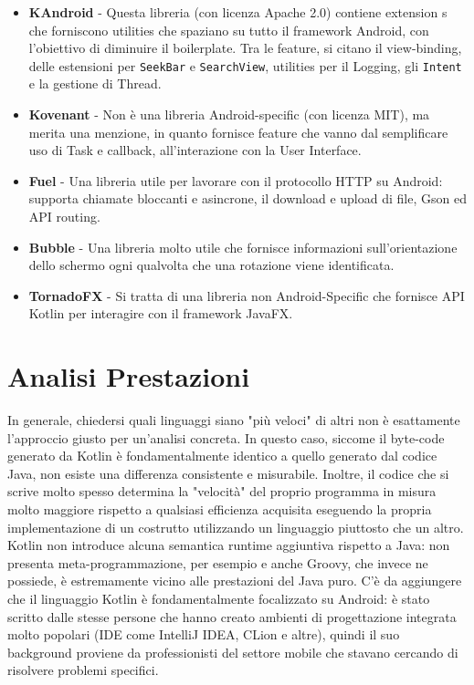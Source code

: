 \begin{itemize}
  \item {\bfseries KAndroid} - Questa libreria (con licenza Apache 2.0) contiene extension s che forniscono utilities che spaziano su tutto il framework Android, con l'obiettivo di diminuire il boilerplate. Tra le feature, si citano il view-binding, delle estensioni per \texttt{SeekBar} e \texttt{SearchView}, utilities per il Logging, gli \texttt{Intent} e la gestione di Thread.
  \item {\bfseries Kovenant} - Non è una libreria Android-specific (con licenza MIT), ma merita una menzione, in quanto fornisce feature che vanno dal semplificare uso di Task e callback, all'interazione con la User Interface.
  \item {\bfseries Fuel} - Una libreria utile per lavorare con il protocollo HTTP su Android: supporta chiamate bloccanti e asincrone, il download e upload di file, Gson ed API routing.
  \item {\bfseries Bubble} - Una libreria molto utile che fornisce informazioni sull'orientazione dello schermo ogni qualvolta che una rotazione viene identificata.
  \item {\bfseries TornadoFX} - Si tratta di una libreria non Android-Specific che fornisce API Kotlin per interagire con il framework JavaFX.\\
\end{itemize}

\section{Analisi Prestazioni}
In generale, chiedersi quali linguaggi siano "più veloci" di altri non è esattamente l'approccio giusto per un'analisi concreta. In questo caso, siccome il byte-code generato da Kotlin è fondamentalmente identico a quello generato dal codice Java, non esiste una differenza consistente e misurabile. Inoltre, il codice che si scrive molto spesso determina la "velocità" del proprio programma in misura molto maggiore rispetto a qualsiasi efficienza acquisita eseguendo la propria implementazione di un costrutto utilizzando un linguaggio piuttosto che un altro.\\
Kotlin non introduce alcuna semantica runtime aggiuntiva rispetto a Java: non presenta meta-programmazione, per esempio e anche Groovy, che invece ne possiede, è estremamente vicino alle prestazioni del Java puro.
C’è da aggiungere che il linguaggio Kotlin è fondamentalmente focalizzato su Android: è stato scritto dalle stesse persone che hanno creato ambienti di progettazione integrata molto popolari (IDE come IntelliJ IDEA, CLion e altre), quindi il suo background proviene da professionisti del settore mobile che stavano cercando di risolvere problemi specifici.\\


